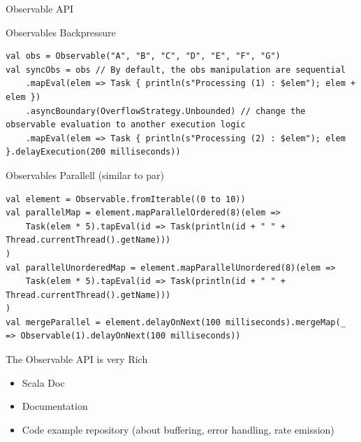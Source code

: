 \documentclass[presentation, 9pt]{beamer}\mode<presentation>{\usetheme{AMSBolognaFC}}
\begin{document}
\begin{frame}{Observable API}
				 \begin{alertblock}{Observables Backpressure}
					\begin{tcolorbox}[left=0pt, top=0pt, bottom=0pt]
								 \begin{verbatim}
val obs = Observable("A", "B", "C", "D", "E", "F", "G")
val syncObs = obs // By default, the obs manipulation are sequential
	.mapEval(elem => Task { println(s"Processing (1) : $elem"); elem + elem })
	.asyncBoundary(OverflowStrategy.Unbounded) // change the observable evaluation to another execution logic
	.mapEval(elem => Task { println(s"Processing (2) : $elem"); elem }.delayExecution(200 milliseconds))
								 \end{verbatim}
							 \end{tcolorbox}
					 \end{alertblock}	
					 \begin{alertblock}{Observables Parallell (similar to par)}
					\begin{tcolorbox}[left=0pt, top=0pt, bottom=0pt]
						\begin{verbatim}
val element = Observable.fromIterable((0 to 10))
val parallelMap = element.mapParallelOrdered(8)(elem =>
	Task(elem * 5).tapEval(id => Task(println(id + " " + Thread.currentThread().getName)))
)
val parallelUnorderedMap = element.mapParallelUnordered(8)(elem =>
	Task(elem * 5).tapEval(id => Task(println(id + " " + Thread.currentThread().getName)))
)
val mergeParallel = element.delayOnNext(100 milliseconds).mergeMap(_ => Observable(1).delayOnNext(100 milliseconds))
							\end{verbatim}
						\end{tcolorbox}
					\end{alertblock}	
					\begin{alertblock}{The Observable API is very Rich}
						\begin{itemize}
							\item Scala Doc \href{https://monix.io/api/current/monix/reactive/index.htmlhttps://monix.io/api/current/monix/reactive/index.html}{\faLink}
       				\item Documentation  \href{https://monix.io/docs/current/reactive/observable.html}{\faLink}
           \item Code example repository (about buffering, error handling, rate emission)  \href{}{\faLink}
						\end{itemize}
					\end{alertblock}	
\end{frame}
\end{document}
